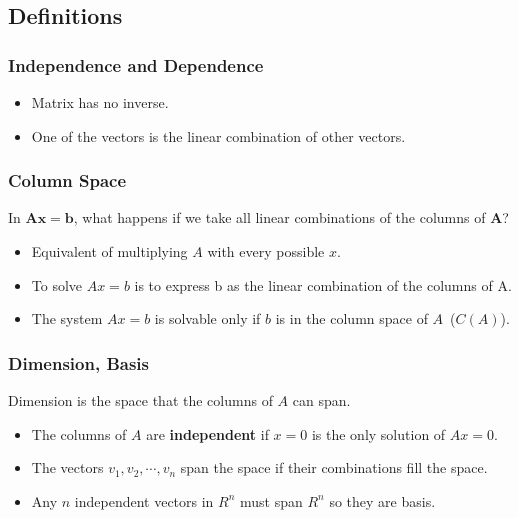 \documentclass{beamer}
\newtheorem{Key points}{Key points}
\begin{document}
\subsection{Definitions}
 \begin{frame}
   \frametitle{Independence and Dependence}
   \begin{itemize}
   \item Matrix has no inverse.
   \item One of the vectors is the linear combination of other vectors.
   \end{itemize}
 \end{frame}
 \begin{frame}
   \frametitle{Column Space}
   In $\mathbf{Ax}=\mathbf{b}$, what happens if we take all linear combinations of the columns of $\mathbf{A}$?
\begin{itemize}
   \item Equivalent of multiplying $A$ with every possible $x$.
   \end{itemize}
 \begin{itemize}
 \item<3-> To solve $Ax=b$ is to express b as the linear combination of the columns of A.
\item<4-> The system $Ax=b$ is solvable only if $b$ is in the column space of $A$~($C(A)$).
 \end{itemize}
 \end{frame}
 \begin{frame}
   \frametitle{Dimension, Basis}
   \begin{definition}
    Dimension is the space that the columns of $A$ can span.
   \end{definition}
 \begin{itemize}
 \item<3-> The columns of $A$ are \textbf{independent} if $x=0$ is the only solution of $Ax=0$.
\item<4-> The vectors $v_1,v_2,\cdots,v_n$ span the space if their combinations fill the space.
\item<5-> Any $n$ independent vectors in $R^n$ must span $R^n$ so they are basis. 
 \end{itemize}
 \end{frame}
\end{document}

